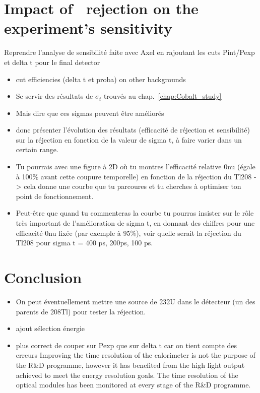 \section{Impact of \Tl\ rejection on the experiment's sensitivity}
Reprendre l'analyse de sensibilité faite avec Axel en rajoutant les cuts Pint/Pexp et delta t pour le final detector

\begin{itemize}
\item cut efficiencies (delta t et proba) on other backgrounds
\item Se servir des résultats de $\sigma_{t}$ trouvés au chap.~\ref{chap:Cobalt_study}
\item Mais dire que ces sigmas peuvent être améliorés
\item donc présenter l'évolution des résultats (efficacité de réjection et sensibilité) sur la réjection en fonction de la valeur de sigma t, à faire varier dans un certain range.
\item Tu pourrais avec une figure à 2D où tu montres l'efficacité relative 0nu (égale à 100\% avant cette coupure temporelle) en fonction de la réjection du Tl208 -> cela donne une courbe que tu parcoures et tu cherches à optimiser ton point de fonctionnement.
\item Peut-être que quand tu commenteras la courbe tu pourras insister sur le rôle très important de l'amélioration de sigma t, en donnant des chiffres pour une efficacité 0nu fixée (par exemple à 95\%), voir quelle serait la réjection du Tl208 pour sigma t = 400 ps, 200ps, 100 ps.
\end{itemize}


\section{Conclusion}

\begin{itemize}
\item On peut éventuellement mettre une source de 232U dans le détecteur (un des parents de 208Tl) pour tester la réjection.
\item ajout sélection énergie
\item plus correct de couper sur Pexp que sur delta t car on tient compte des erreurs
Improving the time resolution of the calorimeter is not the purpose of the R\&D programme, however it has benefited from the high light output achieved to meet the energy resolution goals.
The time resolution of the optical modules has been monitored at every stage of the R\&D programme.

\end{itemize}


